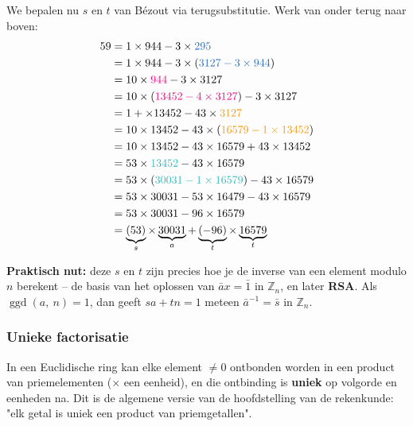 We bepalen nu $s$ en $t$ van Bézout via terugsubstitutie. Werk van onder terug naar boven:
\begin{equation*}
    \begin{aligned}
        59 &= 1 \times 944 - 3 \times \textcolor{NavyBlue}{295} \\
           &= 1 \times 944 - 3 \times (\textcolor{NavyBlue}{3127 - 3 \times 944}) \\
           &= 10 \times \textcolor{RubineRed}{944} - 3 \times 3127 \\
           &= 10 \times (\textcolor{RubineRed}{13452 - 4 \times 3127}) - 3 \times 3127 \\
           &= 1+ \times 13452 - 43 \times \textcolor{YellowOrange}{3127} \\ 
           &= 10 \times 13452 - 43 \times (\textcolor{YellowOrange}{16579 - 1 \times 13452}) \\
           &= 10 \times 13452 - 43 \times 16579 + 43 \times 13452 \\
           &= 53 \times \textcolor{Aquamarine}{13452} - 43 \times 16579 \\
           &= 53 \times (\textcolor{Aquamarine}{30031 - 1 \times 16579}) - 43 \times 16579 \\
           &= 53 \times 30031 - 53 \times 16479 - 43 \times 16579 \\
           &= 53 \times 30031 - 96 \times 16579 \\
           &= \underbrace{(53)}_{s} \times \underbrace{30031}_{a} + \underbrace{(-96)}_{t} \times \underbrace{16579}_{t} 
    \end{aligned}
\end{equation*}

\begin{barbox}[WildStrawberry][gray!3]
    \textcolor{WildStrawberry}{\textbf{Praktisch nut:}} deze $s$ en $t$ zijn precies hoe je de inverse van een element modulo $n$ berekent -- de basis van het oplossen van $\bar{a}x = \bar{1}$ in $\mathbb{Z}_n$, en later \textbf{RSA}. Als $\operatorname{ggd}(a,\ n) = 1$, dan geeft $sa + tn = 1$ meteen $\bar{a}^{-1} = \bar{s}$ in $\mathbb{Z}_n$. 
\end{barbox}

\subsubsection{Unieke factorisatie}

In een Euclidische ring kan elke element $\neq 0$ ontbonden worden in een product van priemelementen ($\times$ een eenheid), en die ontbinding is \textbf{uniek} op volgorde en eenheden na. Dit is de algemene versie van de hoofdstelling van de rekenkunde: "elk getal is uniek een product van priemgetallen".

